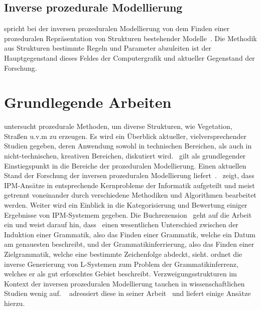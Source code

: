 \subsection*{Inverse prozedurale Modellierung}
\citeauthor{aliaga_2016} spricht bei der inversen prozeduralen Modellierung von dem Finden einer prozeduralen Repräsentation
von Strukturen bestehender Modelle~\cite{aliaga_2016}.
Die Methodik aus Strukturen bestimmte Regeln und Parameter abzuleiten ist der Hauptgegenstand dieses Feldes der
Computergrafik und aktueller Gegenstand der Forschung.

\section{Grundlegende Arbeiten}

\citeauthor{smelik_2014} untersucht prozedurale Methoden, um diverse Strukturen, wie Vegetation, Straßen u.v.m zu erzeugen.
Es wird ein Überblick aktueller, vielversprechender Studien gegeben, deren Anwendung sowohl in technischen Bereichen,
als auch in nicht-technischen, kreativen Bereichen, diskutiert wird.~\cite{smelik_2014} gilt als grundlegender Einstiegspunkt
in die Bereiche der prozeduralen Modellierung.
Einen aktuellen Stand der Forschung der inversen prozeduralen Modellierung liefert~\cite{aliaga_2016}.~
zeigt, dass IPM-Ansätze in entsprechende Kernprobleme der Informatik aufgeteilt und meist getrennt voneinander durch
verschiedene Methodiken und Algorithmen bearbeitet werden.
Weiter wird ein Einblick in die Kategorisierung und Bewertung einiger Ergebnisse von IPM-Systemem gegeben.
Die Buchrezension~\cite{daelemans_2010} geht auf die Arbeit~\cite{higuera_2010} ein und weist darauf hin, dass~\citeauthor{higuera_2010}
einen wesentlichen Unterschied zwischen der Induktion einer Grammatik, also das Finden einer
Grammatik, welche ein Datum am genauesten beschreibt, und der Grammatikinferrierung, also das Finden einer Zielgrammatik,
welche eine bestimmte Zeichenfolge abdeckt, sieht.
\citeauthor{higuera_2010} ordnet die inverse Generierung von L-Systemen zum Problem der Grammatikinferrenz, welches er
als gut erforschtes Gebiet beschreibt.
Verzweigungsstrukturen im Kontext der inversen prozeduralen Modellierung tauchen in wissenschaftlichen Studien wenig auf.
~\cite{guo_2020} adressiert diese in seiner Arbeit~\cite{guo_2020} und liefert einige Ansätze hierzu.\\~\\

